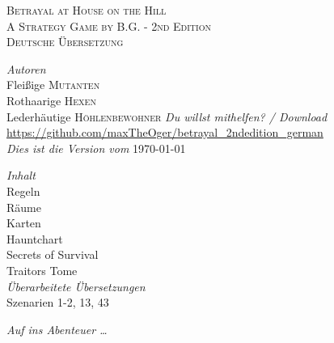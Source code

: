 \begin{titlepage}
\begin{center}
\textsc{\LARGE Betrayal at House on the Hill}\\[0.5cm]

\textsc{A Strategy Game by B.G. - 2nd Edition}\\[1.5cm]

\textsc{\Large Deutsche Übersetzung}\\[0.5cm]



\vspace{1.5cm}

\begin{minipage}{0.4\textwidth}
\begin{flushleft} \large
\emph{Autoren}\\
\vspace{0.3cm}
Fleißige \textsc{Mutanten}\\
Rothaarige \textsc{Hexen}\\
Lederhäutige \textsc{Höhlenbewohner}
\vspace{1.5cm}
\emph{Du willst mithelfen? / Download}
\vspace{0.3cm}
\url{https://github.com/maxTheOger/betrayal\_2ndedition\_german}\\
\vspace{1.5cm}
\emph{Dies ist die Version vom}
\vspace{0.3cm}
{\large \today}


\end{flushleft}
\end{minipage}
\hfill
\begin{minipage}{0.4\textwidth}
\begin{flushright} \large
\emph{Inhalt} \\
\vspace{0.3cm}
Regeln \\
Räume \\
Karten \\
Hauntchart \\
Secrets of Survival \\
Traitors Tome \\
\vspace{1.5cm}
\emph{Überarbeitete Übersetzungen}\\
\vspace{0.3cm}
Szenarien 1-2, 13, 43
\end{flushright}
\end{minipage}

\vfill

{\emph{Auf ins Abenteuer …}}

\end{center}

\end{titlepage}